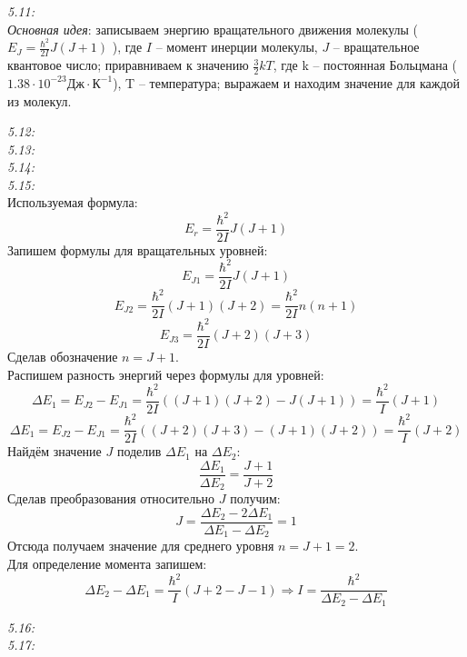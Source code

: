 	\emph{5.11: } \\
		\emph{Основная идея}: записываем энергию вращательного движения молекулы
		( \( E_J = \frac{\hbar^2}{2I}J(J+1) \) ), где \( I \) -- 
		момент инерции молекулы, \( J \) -- вращательное квантовое число; 
		приравниваем к значению \( \frac{3}{2} kT \), где k -- постоянная Больцмана 
		(\( 1.38\cdot10^{-23} \text{Дж}\cdot\text{К}^{-1} \)), T -- 
		температура; выражаем и находим значение для каждой из молекул.

	\emph{5.12: } \\

	\emph{5.13: } \\

	\emph{5.14: } \\

	\emph{5.15: } \\
		Используемая формула: \[ E_r = \frac{\hbar^2}{2I}J(J+1) \]
		Запишем формулы для вращательных уровней:
		\[ E_{J1} = \frac{\hbar^2}{2I}J(J+1) \]
		\[ E_{J2} = \frac{\hbar^2}{2I}(J+1)(J+2) = \frac{\hbar^2}{2I}n(n+1) \]
		\[ E_{J3} = \frac{\hbar^2}{2I}(J+2)(J+3) \]
		Сделав обозначение \( n = J + 1 \). \\
		Распишем разность энергий через формулы для уровней:
		\[ 
			\Delta E_1 = E_{J2} - E_{J1} = 
			\frac{\hbar^2}{2I}((J+1)(J+2) - J(J+1)) = \frac{\hbar^2}{I}(J+1) 
		\]
		\[ 
			\Delta E_1 = E_{J2} - E_{J1} =
			\frac{\hbar^2}{2I}((J+2)(J+3)-(J+1)(J+2)) = \frac{\hbar^2}{I}(J+2)
		\]
		Найдём значение \( J \) поделив \( \Delta E_1 \) на \( \Delta E_2 \):
		\[ \frac{\Delta E_1}{\Delta E_2} = \frac{J+1}{J+2} \]
		Сделав преобразования относительно \( J \) получим:
		\[ J = \frac{\Delta E_2 - 2\Delta E_1}{\Delta E_1 - \Delta E_2} = 1 \]
		Отсюда получаем значение для среднего уровня \( n = J+1 = 2 \). \\
		Для определение момента запишем: 
		\[ 
			\Delta E_2 - \Delta E_1 = \frac{\hbar^2}{I}(J+2-J-1) 
			\Rightarrow I = \frac{\hbar^2}{\Delta E_2 - \Delta E_1}
		\]

	\emph{5.16: } \\

	\emph{5.17: } \\

